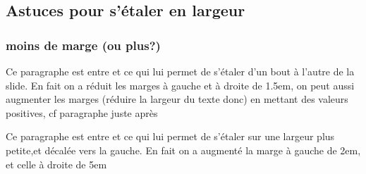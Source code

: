 \subsection{Astuces pour s'étaler en largeur}
\begin{frame}
  \frametitle{moins de marge (ou plus?)}

  \begin{adjustwidth}{-1.5 em}{-1.5em}
    Ce paragraphe est entre 
    \lin{\begin{adjustwidth}{-1.5 em}{-1.5em}} et \lin{\end{adjustwidth}}
    ce qui lui permet de s'étaler  d'un bout à l'autre de la slide.
    En fait on a réduit les marges à gauche et à droite de 1.5em,
    on peut aussi augmenter les marges (réduire la largeur du texte donc) en mettant des valeurs positives, cf paragraphe juste après
  \end{adjustwidth}
  
  \bigskip
  
  \begin{adjustwidth}{2 em}{5em}
    Ce paragraphe est entre 
    \lin{\begin{adjustwidth}{2 em}{5em}} et \lin{\end{adjustwidth}}
    ce qui lui permet de s'étaler sur une largeur plus petite,et décalée vers la gauche.
    En fait on a augmenté la marge à gauche de 2em, et celle à droite de 5em
  \end{adjustwidth}
\end{frame}




